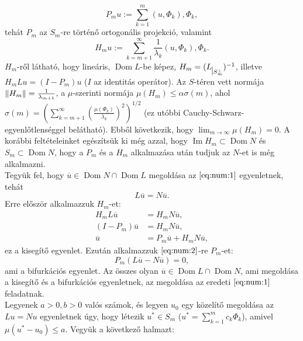\documentclass[oneside, titlepage, 12pt, a4paper]{report}
\DeclareMathOperator{\Ima}{Im}	%
\DeclareMathOperator{\Dom}{Dom}	%
\DeclarePairedDelimiter\norm{\lVert}{\rVert}	%
\begin{document}
\begin{equation*}
P_m u := \sum_{k = 1}^m (u, \Phi_k), \Phi_k,
\end{equation*}
tehát $P_m$ az $S_m$-re történő ortogonális projekció, valamint
\begin{equation*}
H_m u := \sum_{k = m + 1}^\infty \frac{1}{\lambda_k} (u, \Phi_k), \Phi_k.
\end{equation*}
$H_m$-ről látható, hogy lineáris, $\Dom L$-be képez, $H_m = (L_{\mkern 1mu \vrule height 2ex\mkern2mu S_m^\perp})^{-1}$, illetve $H_mLu = (I - P_m)u$ ($I$ az identitás operátor). Az $S$-téren vett normája $\norm{H_m} = \frac{1}{\lambda_{m+1}}$, a $\mu$-szerinti normája $\mu(H_m) \leq \alpha \sigma(m)$, ahol $\sigma(m) = \left(\sum_{k = m+1}^\infty \left( \frac{\mu(\Phi_k)}{\lambda_k}\right)^2\right)^{1/2}$ (ez utóbbi Cauchy-Schwarz-egyenlőtlenséggel belátható). Ebből következik, hogy $\lim_{m \to \infty} \mu(H_m) = 0$. A korábbi feltételeinket egészítsük ki még azzal, hogy $\Ima H_m \subset \Dom N$ és $S_m \subset \Dom N$, hogy a $P_m$ és a $H_m$ alkalmazása után tudjuk az $N$-et is még alkalmazni. \\
Tegyük fel, hogy $\overline{u} \in \Dom N \cap \Dom L$ megoldása az $\eqref{eq:num:1}$ egyenletnek, tehát
\begin{equation}
L\overline{u} = N\overline{u}. \label{eq:num:2}
\end{equation}
Erre először alkalmazzuk $H_m$-et:
\begin{align}
H_m L \overline{u} &= H_m N \overline{u}, \nonumber \\
(I - P_m) \overline{u} &= H_m N \overline{u}, \nonumber \\
\overline{u} &= P_m \overline{u} + H_m N \overline{u}, \label{eq:num:3}
\end{align}
ez a kisegítő egyenlet. Ezután alkalmazzuk $\eqref{eq:num:2}$-re $P_m$-et: %
\begin{equation}
P_m(L \overline{u} - N \overline{u}) = 0, \label{eq:num:4}
\end{equation}
ami a bifurkációs egyenlet. Az összes olyan $\overline{u} \in \Dom L \cap \Dom N$, ami megoldása a kisegítő és a bifurkációs egyenletnek, az megoldása az eredeti $\eqref{eq:num:1}$ feladatnak. \\ %
Legyenek $a > 0, b > 0$ valós számok, és legyen $u_0$ egy közelítő megoldása az $Lu = Nu$ egyenletnek úgy, hogy létezik $u^* \in S_m$ ($u^* = \sum_{k=1}^m c_k \Phi_k$), amivel $\mu(u^* - u_0) \leq a$. Vegyük a következő halmazt:
\end{document}
